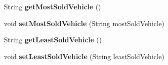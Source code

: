 \begin{DoxyCompactItemize}
String {\bfseries get\+Most\+Sold\+Vehicle} ()
\item 
\mbox{\label{classobjects_1_1_sold_vehicle_a5f32c2d4bb750d3f0a20efd1978a92cc}} 
void {\bfseries set\+Most\+Sold\+Vehicle} (String most\+Sold\+Vehicle)
\item 
\mbox{\label{classobjects_1_1_sold_vehicle_a12b35e13c3fee624ac065fef7d321998}} 
String {\bfseries get\+Least\+Sold\+Vehicle} ()
\item 
\mbox{\label{classobjects_1_1_sold_vehicle_aecfbae44adfe1903fe4687eb7fb2fa33}} 
void {\bfseries set\+Least\+Sold\+Vehicle} (String least\+Sold\+Vehicle)
\end{DoxyCompactItemize}
